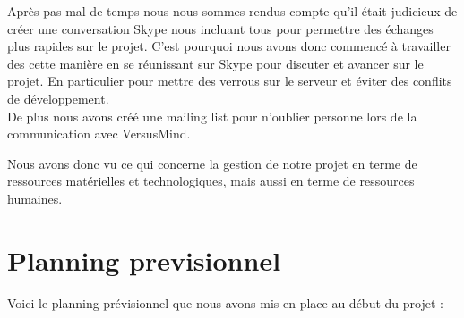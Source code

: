 \documentclass[12pt]{report}
\begin{document}
Après pas mal de temps nous nous sommes rendus compte qu'il était judicieux de créer une conversation Skype nous incluant tous pour permettre des échanges plus rapides sur le projet. C'est pourquoi nous avons donc commencé à travailler des cette manière en se réunissant sur Skype pour discuter et avancer sur le projet. En particulier pour mettre des verrous sur le serveur et éviter des conflits de développement.\\

De plus nous avons créé une mailing list pour n'oublier personne lors de la communication avec VersusMind.

Nous avons donc vu ce qui concerne la gestion de notre projet en terme de ressources matérielles et technologiques, mais aussi en terme de ressources humaines.\\

	\section{Planning previsionnel}
	
	Voici le planning prévisionnel que nous avons mis en place au début du projet :\\
\end{document}
